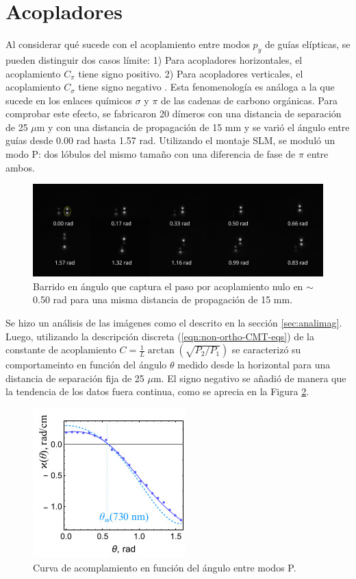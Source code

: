 \section{Acopladores}
Al considerar qué sucede con el acoplamiento entre modos $p_y$ de guías elípticas, se pueden distinguir dos casos límite: 1) Para acopladores horizontales, el acoplamiento $C_\pi$ tiene signo positivo. 2) Para acopladores verticales, el acoplamiento $C_\sigma$ tiene signo negativo \cite{Pmodecoupling}. Esta fenomenología es análoga a la que sucede en los enlaces químicos $\sigma$ y $\pi$ de las cadenas de carbono orgánicas. Para comprobar este efecto, se fabricaron 20 dímeros con una distancia de separación de 25 $\mu$m y con una distancia de propagación de 15 mm y se varió el ángulo entre guías desde 0.00 rad hasta 1.57 rad. Utilizando el montaje SLM, se moduló un modo P: dos lóbulos del mismo tamaño con una diferencia de fase de $\pi$ entre ambos.
\begin{figure}[H]
	\centering
	\includegraphics[trim={0 2cm 0 4cm},clip, width=\linewidth]{media/26um_15mm_angles.png}
	\caption{Barrido en ángulo que captura el paso por acoplamiento nulo en $\sim$0.50 rad para una misma distancia de propagación de 15 mm. \label{fig:angulobarrido}}
\end{figure}
Se hizo un análisis de las imágenes como el descrito en la sección \ref{sec:analimag}. Luego, utilizando la descripción discreta (\ref{eqn:non-ortho-CMT-eqs}) de la constante de acoplamiento $C = \frac{1}{L}\arctan\left(\sqrt{P_2/P_1}\right)$ se caracterizó su comportameinto en función del ángulo $\theta$ medido desde la horizontal para una distancia de separación fija de 25 $\mu$m. El signo negativo se añadió de manera que la tendencia de los datos fuera continua, como se aprecia en la Figura \ref{fig:coupangle}.
\begin{figure}[H]
\centering
	\includegraphics[width=0.5\linewidth]{media/couplingvsangle.jpg}
	\caption{Curva de acomplamiento en función del ángulo entre modos P.\label{fig:coupangle}}
\end{figure}
